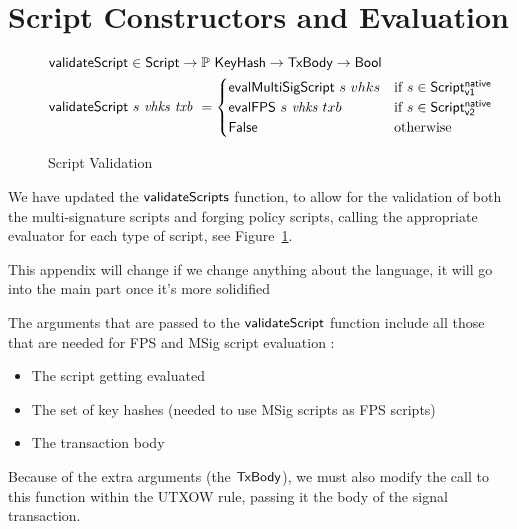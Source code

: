 \section{Script Constructors and Evaluation}
\label{sec:mps-lang}


\begin{figure}[htb]
  \begin{align*}
    \mathsf{validateScript} & \in\mathsf{Script}\to
    \mathbb{P}~\mathsf{KeyHash}\to\mathsf{TxBody}\to\mathsf{Bool} \\
    \mathsf{validateScript} & ~s~\mathit{vhks}~\mathit{txb}~=
                           \begin{cases}
                             \mathsf{evalMultiSigScript}~s~vhks & \text{if}~s \in\mathsf{Script^{native}_{v1}} \\
                             \mathsf{evalFPS}~s~\mathit{vhks} ~txb & \text{if}~s \in\mathsf{Script^{native}_{v2}} \\
                             \mathsf{False} & \text{otherwise}
                           \end{cases}
  \end{align*}
  \caption{Script Validation}
  \label{fig:functions-validate}
\end{figure}

We have updated the
$\mathsf{validateScripts}$ function, to allow for the validation of both the
multi-signature scripts and forging policy scripts, calling the appropriate
evaluator for each type of script, see Figure~\ref{fig:functions-validate}.

\begin{note}
  This appendix will change if we change anything about the language, it will go
  into the main part once it's more solidified
\end{note}

The arguments that are passed to the $\mathsf{validateScript}$ function include all those
that are needed for FPS and MSig script evaluation :

\begin{itemize}
\item The script getting evaluated
\item The set of key hashes (needed to use MSig scripts as FPS scripts)
\item The transaction body
\end{itemize}

Because of the extra arguments
(the $\mathsf{TxBody}$), we must also modify the call to this function
within the UTXOW rule, passing it the body of the signal transaction.

